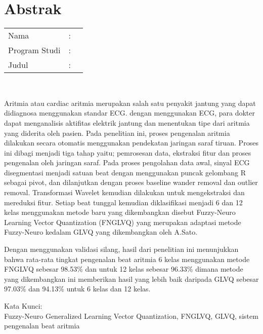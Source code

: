 %
%
%

\chapter*{Abstrak}

\vspace*{0.2cm}

\noindent \begin{tabular}{l l p{10cm}}
	Nama&: & \penulis \\
	Program Studi&: & \programstudi \\
	Judul&: & \judul \\
\end{tabular} \\ 

\vspace*{0.5cm}

\noindent

Aritmia atau cardiac aritmia merupakan salah satu penyakit jantung yang dapat
didiagnosa menggunakan standar ECG. dengan menggunakan ECG, para dokter dapat
menganalisis aktifitas elektrik jantung dan menentukan tipe dari aritmia yang
diderita oleh pasien. 
Pada penelitian ini, proses pengenalan aritmia dilakukan secara
otomatis menggunakan pendekatan jaringan saraf tiruan. Proses ini dibagi menjadi
tiga tahap yaitu; pemrosesan data, ekstraksi fitur dan proses pengenalan
oleh jaringan saraf. Pada proses pengolahan data awal, sinyal ECG disegmentasi
menjadi satuan beat dengan menggunakan puncak gelombang R sebagai pivot, dan
dilanjutkan dengan proses baseline wander removal dan outlier removal.
Transformasi Wavelet kemudian dilakukan untuk mengekstraksi dan mereduksi fitur.
Setiap beat tunggal kemudian diklasifikasi menjadi 6 dan 12 kelas menggunakan
metode baru yang dikembangkan disebut Fuzzy-Neuro Learning Vector
Quantization (FNGLVQ) yang merupakan adaptasi metode Fuzzy-Neuro kedalam GLVQ
yang dikembangkan oleh A.Sato. 

Dengan menggunakan validasi silang, hasil dari penelitian ini menunjukkan bahwa
rata-rata tingkat pengenalan beat aritmia 6 kelas menggunakan metode FNGLVQ
sebesar 98.53\% dan untuk 12 kelas sebesar 96.33\% dimana metode yang
dikembangkan ini memberikan hasil yang lebih baik daripada GLVQ sebesar 97.03\%
dan 94.13\% untuk 6 kelas dan 12 kelas.
\\

\vspace*{0.2cm}

\noindent Kata Kunci: \\ 
\noindent Fuzzy-Neuro Generalized Learning Vector Quantization, FNGLVQ,
GLVQ, sistem pengenalan beat aritmia\\

\newpage